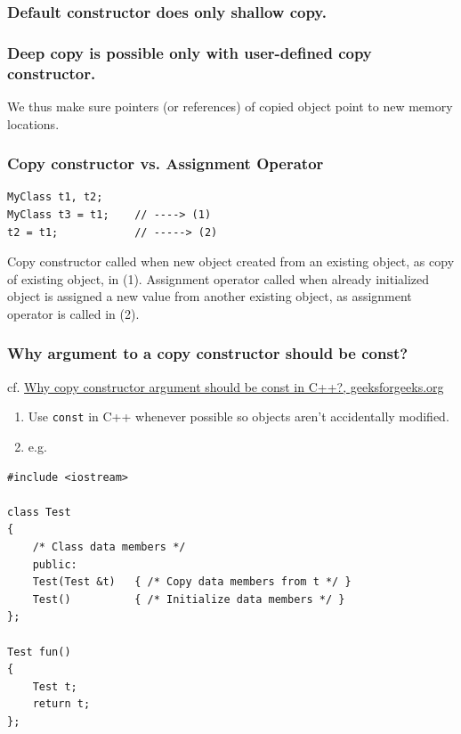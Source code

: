 \documentclass[10pt]{amsart}
\begin{document}
\begin{multicols*}{2}
\subsubsection{Default constructor does only shallow copy.}  

\subsubsection{Deep copy is possible only with user-defined copy constructor.}  

We thus make sure pointers (or references) of copied object point to new memory locations.  

\subsubsection{Copy constructor vs. Assignment Operator}  

\begin{lstlisting}  
MyClass t1, t2; 
MyClass t3 = t1; 	// ----> (1)
t2 = t1; 			// -----> (2)
\end{lstlisting}

Copy constructor called when new object created from an existing object, as copy of existing object, in (1).  
Assignment operator called when already initialized object is assigned a new value from another existing object, as assignment operator is called in (2).  

\subsubsection{Why argument to a copy constructor should be const?  } 

cf. \href{http://www.geeksforgeeks.org/copy-constructor-argument-const/}{Why copy constructor argument should be const in C++?, geeksforgeeks.org}

\begin{enumerate}
\item Use \verb|const| in C++ whenever possible so objects aren't accidentally modified.  
\item e.g.  
\end{enumerate}

\begin{lstlisting}  
#include <iostream>  

class Test
{
	/* Class data members */
	public:
	Test(Test &t) 	{ /* Copy data members from t */ } 
	Test()			{ /* Initialize data members */ }
};

Test fun() 
{
	Test t;
	return t;
};


\end{lstlisting}
\end{multicols*}
\end{document}
